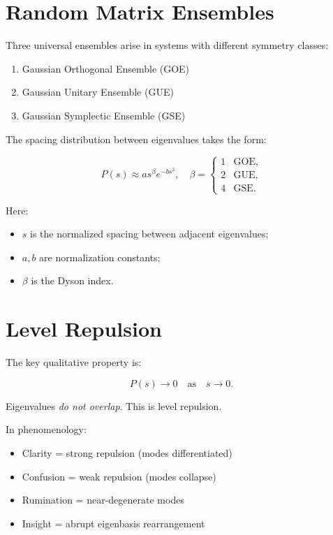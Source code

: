 \documentclass[12pt]{article}
\begin{document}
\section{Random Matrix Ensembles}

Three universal ensembles arise in systems with different symmetry classes:

\begin{enumerate}
    \item Gaussian Orthogonal Ensemble (GOE)
    \item Gaussian Unitary Ensemble (GUE)
    \item Gaussian Symplectic Ensemble (GSE)
\end{enumerate}

The spacing distribution between eigenvalues takes the form:

\[
P(s) \approx a s^\beta e^{-b s^2},
\quad
\beta = 
\begin{cases}
1 & \text{GOE}, \\
2 & \text{GUE}, \\
4 & \text{GSE}.
\end{cases}
\]

Here:

\begin{itemize}
    \item $s$ is the normalized spacing between adjacent eigenvalues;
    \item $a,b$ are normalization constants;
    \item $\beta$ is the Dyson index.
\end{itemize}

\section{Level Repulsion}

The key qualitative property is:

\[
P(s) \to 0 \quad \text{as} \quad s \to 0.
\]

Eigenvalues \emph{do not overlap}.  
This is level repulsion.

In phenomenology:

\begin{itemize}
    \item Clarity = strong repulsion (modes differentiated)
    \item Confusion = weak repulsion (modes collapse)
    \item Rumination = near-degenerate modes
    \item Insight = abrupt eigenbasis rearrangement
\end{itemize}
\end{document}
